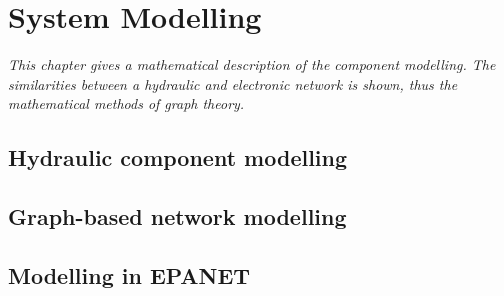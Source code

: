 \chapter{System Modelling}
\label{system_modelling}

\emph{This chapter gives a mathematical description of the component modelling. The similarities between a hydraulic and electronic network is shown, thus the mathematical methods of graph theory.}

\section{Hydraulic component modelling}
\label{hydraulic_component_modelling}

\section{Graph-based network modelling}
\label{graph_based_network_modelling}

\section{Modelling in EPANET}
\label{modelling_in_epanet}